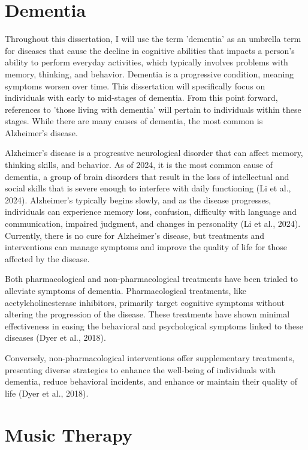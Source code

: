 \documentclass{l4proj}
\begin{document}
\section{Dementia}

Throughout this dissertation, I will use the term 'dementia' as an umbrella term for diseases that cause the decline in cognitive abilities that impacts a person's ability to perform everyday activities, which typically involves problems with memory, thinking, and behavior. Dementia is a progressive condition, meaning symptoms worsen over time. This dissertation will specifically focus on individuals with early to mid-stages of dementia. From this point forward, references to 'those living with dementia' will pertain to individuals within these stages. While there are many causes of dementia, the most common is Alzheimer's disease.

Alzheimer's disease is a progressive neurological disorder that can affect memory, thinking skills, and behavior. As of 2024, it is the most common cause of dementia, a group of brain disorders that result in the loss of intellectual and social skills that is severe enough to interfere with daily functioning (Li et al., 2024). Alzheimer's typically begins slowly, and as the disease progresses, individuals can experience memory loss, confusion, difficulty with language and communication, impaired judgment, and changes in personality (Li et al., 2024). Currently, there is no cure for Alzheimer's disease, but treatments and interventions can manage symptoms and improve the quality of life for those affected by the disease.

Both pharmacological and non-pharmacological treatments have been trialed to alleviate symptoms of dementia. Pharmacological treatments, like acetylcholinesterase inhibitors, primarily target cognitive symptoms without altering the progression of the disease. These treatments have shown minimal effectiveness in easing the behavioral and psychological symptoms linked to these diseases (Dyer et al., 2018).

Conversely, non-pharmacological interventions offer supplementary treatments, presenting diverse strategies to enhance the well-being of individuals with dementia, reduce behavioral incidents, and enhance or maintain their quality of life (Dyer et al., 2018).

\section{Music Therapy}\label{sec:music_therapy}
\end{document}
